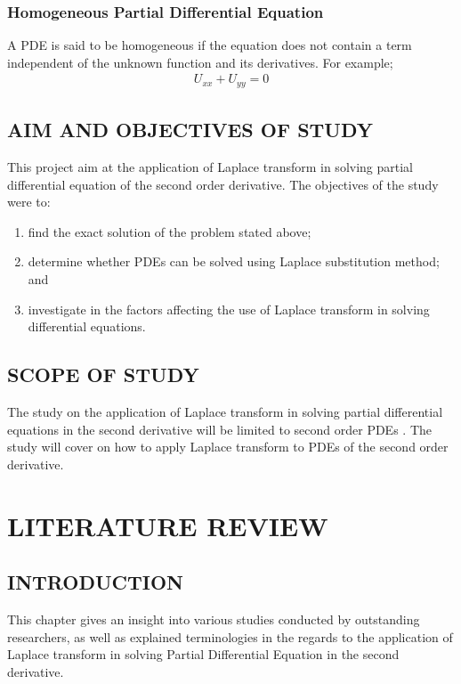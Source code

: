 \documentclass[11pt]{report}
\newcommand{\PDe}{Partial Differential Equation }
\newcommand{\PDEs}{PDEs }
\begin{document}
	\subsection{Homogeneous Partial Differential Equation}
	A PDE is said to be homogeneous if the equation does not contain a term independent of the unknown function and its derivatives. For example;
	\begin{eqnarray}
		U_{xx} + U_{yy} = 0\label{eq:3_8}
	\end{eqnarray}

	\section{AIM AND OBJECTIVES OF STUDY}
	This project aim at the application of Laplace transform in solving partial differential equation of the second order derivative. The objectives of the study were to:
	\begin{enumerate}
		\renewcommand{\labelenumi}{\roman{enumi}.}
		\item find the exact solution of the problem stated above;
		\item determine whether \PDEs can be solved using Laplace substitution method; and
		\item investigate in the factors affecting the use of Laplace transform in solving differential equations.
	\end{enumerate}

	\section{SCOPE OF STUDY}
	The study on the application of Laplace transform in solving partial differential equations in the second derivative will be limited to second order \PDEs. The study will cover on how to apply Laplace transform to \PDEs of the second order derivative. 
	
	
	\chapter{LITERATURE REVIEW}
	\section{INTRODUCTION}
	This chapter gives an insight into various studies conducted by outstanding researchers, as well as explained terminologies in the regards to the application of Laplace transform in solving \PDe in the second derivative.
	
\end{document}
